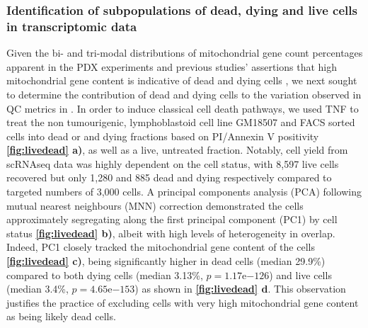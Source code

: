  \subsubsection{Identification of subpopulations of dead, dying and live cells in transcriptomic data}
Given the bi- and tri-modal distributions of mitochondrial gene count percentages \cite{o2019dissociation} apparent in the PDX experiments and previous studies' assertions that high mitochondrial gene content is indicative of dead and dying cells \cite{ilicic2016classification, zhao2002mitochondrial}, we next sought to determine the contribution of dead and dying cells to the variation observed in QC metrics in \cite{o2019dissociation}. In order to induce classical cell death pathways, we used TNF\textalpha    
  \cite{carswell1975endotoxin, sedger2014tnf} to treat the non tumourigenic, lymphoblastoid cell line GM18507 and FACS sorted cells into dead or and dying fractions based on PI/Annexin V positivity \textbf{\autoref{fig:livedead} a)}, as well as a live, untreated fraction. Notably, cell yield from scRNAseq data was highly dependent on the cell status, with 8,597 live cells recovered but only 1,280 and 885 dead and dying respectively compared to targeted numbers of 3,000 cells. 
A principal components analysis (PCA) following mutual nearest neighbours (MNN) correction \cite{haghverdi2018batch} demonstrated the cells approximately segregating along the first principal component (PC1) by cell status \textbf{\autoref{fig:livedead} b)}, albeit with high levels of heterogeneity in overlap. Indeed, PC1 closely tracked the mitochondrial gene content of the cells \textbf{\autoref{fig:livedead} c)}, being significantly higher in dead cells (median 29.9\%) compared to both dying cells (median 3.13\%, $p=1.17 \mathrm{e}{-126}$) and live cells (median 3.4\%, $p=4.65 \mathrm{e}{-153}$) as shown in \textbf{\autoref{fig:livedead} d}.
This observation justifies the practice of excluding cells with very high mitochondrial gene content as being likely dead cells.


